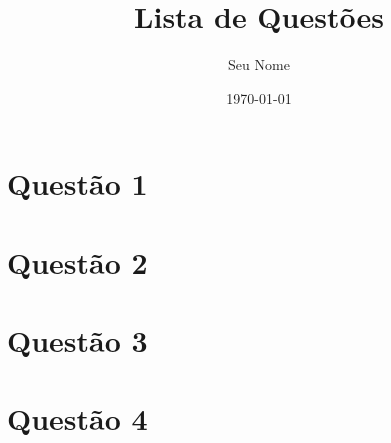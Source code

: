 \documentclass[a4paper,12pt]{article}
\title{Lista de Questões}
\author{Seu Nome}
\date{\today}
\begin{document}
\maketitle

\begin{multicols}{2}
\section{Questão 1}
\lipsum[1]

\section{Questão 2}
\lipsum[2]

\section{Questão 3}
\lipsum[3]

\section{Questão 4}
\lipsum[4]
\end{multicols}
\end{document}
